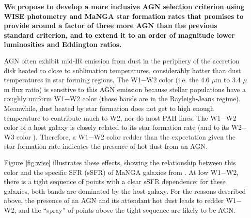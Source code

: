 \documentclass[12pt, preprint]{hacked-aastex}
\begin{document}
{\bf We propose to develop a more inclusive AGN selection criterion
  using WISE photometry and MaNGA star formation rates that promises
  to provide around a factor of three more AGN than the previous
  standard criterion, and to extend it to an order of magnitude lower
  luminosities and Eddington ratios.}

AGN often exhibit mid-IR emission from dust in the periphery of the
accretion disk heated to close to sublimation temperatures,
considerably hotter than dust temperatures in star forming regions.
The W1$-$W2 color (i.e. the 4.6 $\mu$m to 3.4 $\mu$m flux ratio) is
sensitive to this AGN emission because stellar populations have a
roughly uniform W1$-$W2 color (those bands are in the Rayleigh-Jeans
regime).  Meanwhile, dust heated by star formation does not get to
high enough temperature to contribute much to W2, nor do most PAH
lines.  The W1$-$W2 color of a host galaxy is closely related to its
star formation rate (and to its W2$-$W3 color \cite{hviding22a}).
Therefore, a W1$-$W2 color redder than the expectation given the star
formation rate indicates the presence of hot dust from an AGN.

Figure \ref{fig:wise} illustrates these effects, showing the
relationship between this color and the specific SFR (sSFR) of MaNGA
galaxies from \cite{sanchez22a}.  At low W1$-$W2, there is a tight
sequence of points with a clear sSFR dependence; for these galaxies,
both bands are dominated by the host galaxy.  For the reasons
described above, the presence of an AGN and its attendant hot dust
leads to redder W1$-$W2, and the ``spray'' of points above the tight
sequence are likely to be AGN.
\end{document}
